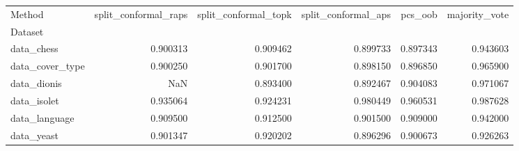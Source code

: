 \begin{tabular}{lrrrrr}
\toprule
Method & split_conformal_raps & split_conformal_topk & split_conformal_aps & pcs_oob & majority_vote \\
Dataset &  &  &  &  &  \\
\midrule
data_chess & 0.900313 & 0.909462 & 0.899733 & 0.897343 & 0.943603 \\
data_cover_type & 0.900250 & 0.901700 & 0.898150 & 0.896850 & 0.965900 \\
data_dionis & NaN & 0.893400 & 0.892467 & 0.904083 & 0.971067 \\
data_isolet & 0.935064 & 0.924231 & 0.980449 & 0.960531 & 0.987628 \\
data_language & 0.909500 & 0.912500 & 0.901500 & 0.909000 & 0.942000 \\
data_yeast & 0.901347 & 0.920202 & 0.896296 & 0.900673 & 0.926263 \\
\bottomrule
\end{tabular}
